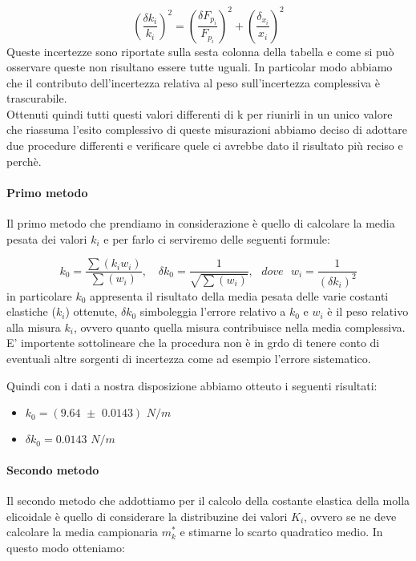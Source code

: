\begin{equation*}
	\left(\frac{\delta {k_{i}}}{k_{i}}\right)^2  =  \left(\frac{\delta F_{p_{i}}}{F_{p_{i}}}\right)^2  +  \left(\frac{\delta_{x_{i}}}{x_{i}}\right)^2 
\end{equation*}
Queste incertezze sono riportate sulla sesta colonna della tabella e come si può osservare queste non risultano essere tutte uguali. In particolar modo abbiamo che il contributo dell'incertezza relativa al peso sull'incertezza complessiva è trascurabile.\\
Ottenuti quindi tutti questi valori differenti di k per riunirli in un unico valore che riassuma l'esito complessivo di queste misurazioni abbiamo deciso di adottare due procedure differenti e verificare quele ci avrebbe dato il risultato più reciso e perchè.

\paragraph{Primo metodo\\}
Il primo metodo che prendiamo in considerazione è quello di calcolare la media pesata dei valori $k_{i}$ e per farlo ci serviremo delle seguenti formule:

\begin{equation}
		k_{0} = \frac{\sum (k_i w_i)}{\sum (w_i)} , \,\,\,\,\,\, \delta k_0 = \frac{1}{\sqrt{\sum (w_i)}} , \,\,\,\,dove\,\,\,\, w_i = \frac{1}{(\delta k_i)^2}
\end{equation}
in particolare $k_0$ appresenta il risultato della media pesata delle varie costanti elastiche ($k_i$) ottenute, $\delta k_0$ simboleggia l'errore relativo a $k_0$ e $w_i$ è il peso relativo alla misura $k_i$, ovvero quanto quella misura contribuisce nella media complessiva. E' importente sottolineare che la procedura non è in grdo di tenere conto di eventuali altre sorgenti di incertezza come ad esempio l'errore sistematico.

Quindi con i dati a nostra disposizione abbiamo otteuto i seguenti risultati:
\begin{itemize}
	\item{  $  k_{0} = (9.64 \,\, \pm \,\, 0.0143)\,\,N/m  $  }
	\item{  $  \delta k_0 = 0.0143 \,\, N/m  $  }
\end{itemize}

\paragraph{Secondo metodo\\}
Il secondo metodo che addottiamo per il calcolo della costante elastica della molla elicoidale è quello di considerare la distribuzine dei valori $K_i$, ovvero se ne deve calcolare la media campionaria $m^*_k$ e stimarne lo scarto quadratico medio. In questo modo otteniamo:

